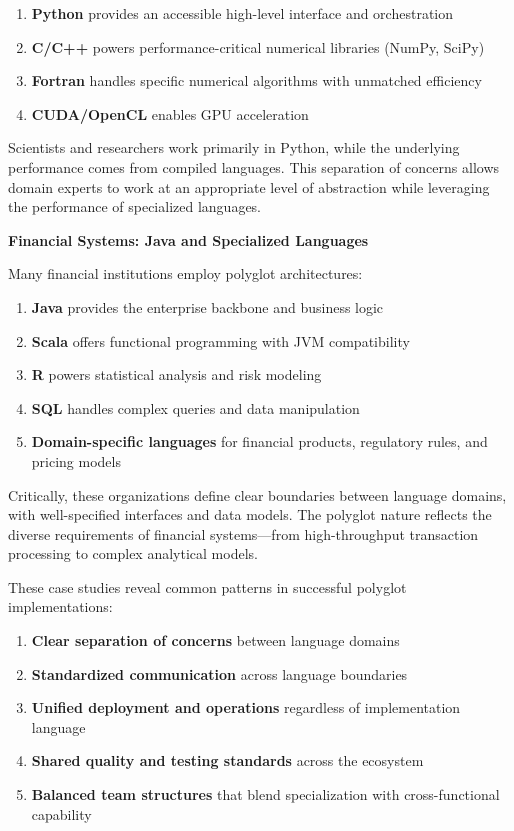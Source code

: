 \documentclass[11pt]{article}
\begin{document}
\begin{enumerate}
\item \textbf{Python} provides an accessible high-level interface and orchestration
\item \textbf{C/C++} powers performance-critical numerical libraries (NumPy, SciPy)
\item \textbf{Fortran} handles specific numerical algorithms with unmatched efficiency
\item \textbf{CUDA/OpenCL} enables GPU acceleration
\end{enumerate}

Scientists and researchers work primarily in Python, while the underlying performance comes from compiled languages. This separation of concerns allows domain experts to work at an appropriate level of abstraction while leveraging the performance of specialized languages.

\textbf{\textbf{Financial Systems: Java and Specialized Languages}}

Many financial institutions employ polyglot architectures:

\begin{enumerate}
\item \textbf{Java} provides the enterprise backbone and business logic
\item \textbf{Scala} offers functional programming with JVM compatibility
\item \textbf{R} powers statistical analysis and risk modeling
\item \textbf{SQL} handles complex queries and data manipulation
\item \textbf{Domain-specific languages} for financial products, regulatory rules, and pricing models
\end{enumerate}

Critically, these organizations define clear boundaries between language domains, with well-specified interfaces and data models. The polyglot nature reflects the diverse requirements of financial systems—from high-throughput transaction processing to complex analytical models.

These case studies reveal common patterns in successful polyglot implementations:

\begin{enumerate}
\item \textbf{Clear separation of concerns} between language domains
\item \textbf{Standardized communication} across language boundaries
\item \textbf{Unified deployment and operations} regardless of implementation language
\item \textbf{Shared quality and testing standards} across the ecosystem
\item \textbf{Balanced team structures} that blend specialization with cross-functional capability
\end{enumerate}
\end{document}
